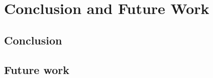 \chapter{Conclusion and Future Work}
\label{chap:conclusion_and_Future_Work}
\section{Conclusion}
\label{sec:Conclusion}
\section{Future work}
\label{sec:Future_Work}





